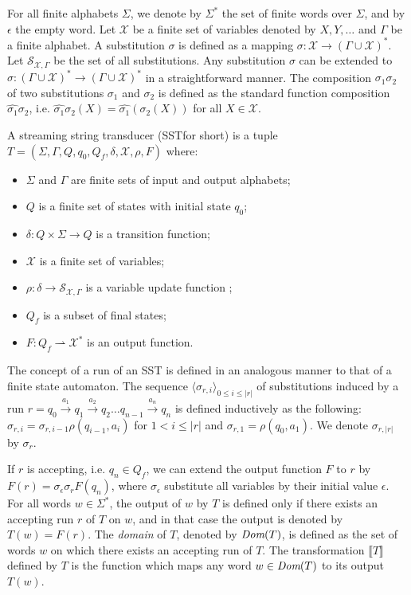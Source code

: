 \documentclass{llncs}
\newcommand\inter[1]{\llbracket #1 \rrbracket}
\newcommand{\sst}{\textnormal{SST}}
\newcommand{\seq}[1]{\langle #1 \rangle}
\newcommand{\Vars}{\mathcal{X}}
\begin{document}
For all finite alphabets $\Sigma$, we denote by $\Sigma^*$ the set of
finite words over $\Sigma$, and by $\epsilon$ the empty word. 
Let $\Vars$ be a finite set of variables denoted by $X,Y,\dots$ and $\Gamma$ be a finite alphabet. 
A substitution $\sigma$ is defined as a mapping ${\sigma : \Vars \to (\Gamma \cup
  \Vars)^*}$. Let $\mathcal{S}_{\Vars, \Gamma}$ be the set of all substitutions.
Any substitution $\sigma$ can be extended to $\hat{\sigma}: (\Gamma \cup \Vars)^*
\to (\Gamma \cup \Vars)^*$ in a straightforward manner.
The composition $\sigma_1 \sigma_2$  of two substitutions $\sigma_1$ and $\sigma_2$
is defined as the standard function composition  $\hat{\sigma_1} \sigma_2$,
i.e. $\hat{\sigma_1}\sigma_2(X) = \hat{\sigma_1}(\sigma_2(X))$ for all $X \in \Vars$. 
\begin{definition}
  \label{def:sst}
  A streaming string transducer (\sst for short) is a tuple 
  $T = (\Sigma, \Gamma, Q, q_0, Q_f, \delta, \Vars, \rho, F)$ where:
  \begin{itemize}
  \item
    $\Sigma$ and $\Gamma$ are finite sets of input and output alphabets;
  \item 
    $Q$ is a finite set of states with initial state $q_0$;
  \item 
    $\delta : Q \times \Sigma \to Q$ is a transition function;
  \item 
    $\Vars$ is a finite set of variables;
  \item 
    $\rho : \delta \to \mathcal{S}_{\Vars, \Gamma}$ is a variable update
    function ;  
  \item $Q_f$ is a subset of final states;
  \item 
    $F: Q_f \rightharpoonup \Vars^*$ is an output  function.
  \end{itemize}
\end{definition}

The concept of a run of an \sst{} is defined in an analogous manner to that of
a finite state automaton.
The sequence $\seq{\sigma_{r, i}}_{0 \leq i \leq |r|}$ of substitutions induced
by a run $r = q_0 \xrightarrow{a_1} q_1 \xrightarrow{a_2} q_2 \ldots q_{n-1}\xrightarrow{a_n} q_n$ is defined
inductively as the following: $\sigma_{r, i} {=} \sigma_{r, i{-}1} \rho(q_{i-1}, a_{i})$
for $1 < i \leq |r|$ and $\sigma_{r,1} = \rho(q_0,a_1)$. We denote $\sigma_{r,|r|}$ by $\sigma_r$. 


If $r$ is accepting, i.e. $q_n\in Q_f$, we can extend the output function $F$ to $r$ by 
$F(r) = \sigma_\epsilon\sigma_{r}F(q_n)$, where $\sigma_\epsilon$
substitute all variables by their initial value $\epsilon$. For all
words $w\in\Sigma^*$, the output of $w$ by $T$ is defined only if there exists an accepting run $r$ of $T$ on $w$, and in that case the output
is denoted by $T(w) = F(r)$. The \emph{domain} of $T$, denoted by
$\textit{Dom}(T)$, is defined as the set of words $w$ on which there exists
an accepting run of $T$. The transformation $\inter{T}$ defined by
$T$ is the function which maps any word $w\in \textit{Dom}(T)$ to its output
$T(w)$. 
\end{document}
